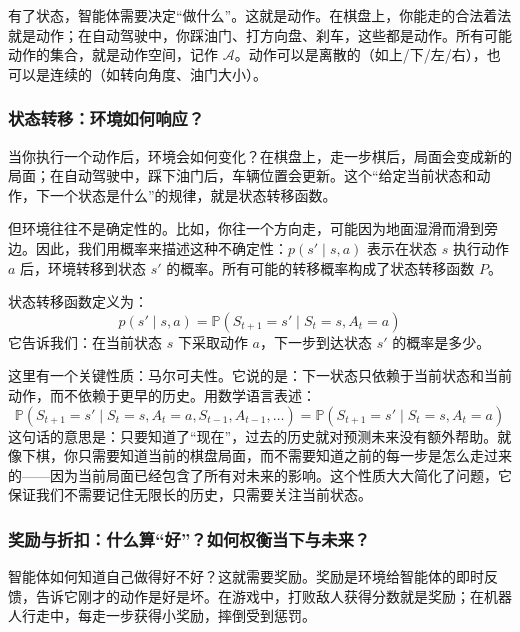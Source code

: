 \documentclass[lang=cn,zihao=-4,a4paper,fontset=windows]{beautybook}
\begin{document}
有了状态，智能体需要决定“做什么”。这就是动作。在棋盘上，你能走的合法着法就是动作；在自动驾驶中，你踩油门、打方向盘、刹车，这些都是动作。所有可能动作的集合，就是动作空间，记作 $\mathcal{A}$。动作可以是离散的（如上/下/左/右），也可以是连续的（如转向角度、油门大小）。

\subsubsection{状态转移：环境如何响应？}

当你执行一个动作后，环境会如何变化？在棋盘上，走一步棋后，局面会变成新的局面；在自动驾驶中，踩下油门后，车辆位置会更新。这个“给定当前状态和动作，下一个状态是什么”的规律，就是状态转移函数。

但环境往往不是确定性的。比如，你往一个方向走，可能因为地面湿滑而滑到旁边。因此，我们用概率来描述这种不确定性：$p(s' \mid s, a)$ 表示在状态 $s$ 执行动作 $a$ 后，环境转移到状态 $s'$ 的概率。所有可能的转移概率构成了状态转移函数 $P$。

\begin{definition}[][状态转移函数 $P$]
状态转移函数定义为：
\[
p(s' \mid s, a) = \mathbb{P}(S_{t+1} = s' \mid S_t = s, A_t = a)
\]
它告诉我们：在当前状态 $s$ 下采取动作 $a$，下一步到达状态 $s'$ 的概率是多少。
\end{definition}

这里有一个关键性质：马尔可夫性。它说的是：下一状态只依赖于当前状态和当前动作，而不依赖于更早的历史。用数学语言表述：
\[
\mathbb{P}(S_{t+1} = s' \mid S_t = s, A_t = a, S_{t-1}, A_{t-1}, \ldots) = \mathbb{P}(S_{t+1} = s' \mid S_t = s, A_t = a)
\]
这句话的意思是：只要知道了“现在”，过去的历史就对预测未来没有额外帮助。就像下棋，你只需要知道当前的棋盘局面，而不需要知道之前的每一步是怎么走过来的——因为当前局面已经包含了所有对未来的影响。这个性质大大简化了问题，它保证我们不需要记住无限长的历史，只需要关注当前状态。

\subsubsection{奖励与折扣：什么算“好”？如何权衡当下与未来？}

智能体如何知道自己做得好不好？这就需要奖励。奖励是环境给智能体的即时反馈，告诉它刚才的动作是好是坏。在游戏中，打败敌人获得分数就是奖励；在机器人行走中，每走一步获得小奖励，摔倒受到惩罚。
\end{document}
